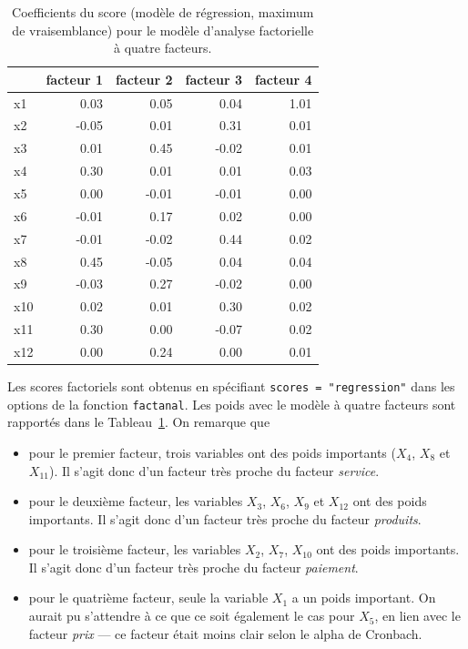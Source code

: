 \documentclass[
  11pt,
  letterpaper,
]{book}
\providecommand{\tightlist}{%
  \setlength{\itemsep}{0pt}\setlength{\parskip}{0pt}}\usepackage{longtable,booktabs,array}
\theoremstyle{definition}
\theoremstyle{remark}
\begin{document}
\hypertarget{tbl-scores}{}
\begin{table}
\caption{\label{tbl-scores}Coefficients du score (modèle de régression, maximum de vraisemblance)
pour le modèle d'analyse factorielle à quatre facteurs. }\tabularnewline

\centering
\begin{tabular}{lrrrr}
\toprule
  & facteur 1 & facteur 2 & facteur 3 & facteur 4\\
\midrule
x1 & 0.03 & 0.05 & 0.04 & 1.01\\
x2 & -0.05 & 0.01 & 0.31 & 0.01\\
x3 & 0.01 & 0.45 & -0.02 & 0.01\\
x4 & 0.30 & 0.01 & 0.01 & 0.03\\
x5 & 0.00 & -0.01 & -0.01 & 0.00\\
\addlinespace
x6 & -0.01 & 0.17 & 0.02 & 0.00\\
x7 & -0.01 & -0.02 & 0.44 & 0.02\\
x8 & 0.45 & -0.05 & 0.04 & 0.04\\
x9 & -0.03 & 0.27 & -0.02 & 0.00\\
x10 & 0.02 & 0.01 & 0.30 & 0.02\\
\addlinespace
x11 & 0.30 & 0.00 & -0.07 & 0.02\\
x12 & 0.00 & 0.24 & 0.00 & 0.01\\
\bottomrule
\end{tabular}
\end{table}

Les scores factoriels sont obtenus en spécifiant
\texttt{scores\ =\ "regression"} dans les options de la fonction
\texttt{factanal}. Les poids avec le modèle à quatre facteurs sont
rapportés dans le Tableau~\ref{tbl-scores}. On remarque que

\begin{itemize}
\tightlist
\item
  pour le premier facteur, trois variables ont des poids importants
  (\(X_4\), \(X_8\) et \(X_{11}\)). Il s'agit donc d'un facteur très
  proche du facteur \emph{service}.
\item
  pour le deuxième facteur, les variables \(X_3\), \(X_6\), \(X_9\) et
  \(X_{12}\) ont des poids importants. Il s'agit donc d'un facteur très
  proche du facteur \emph{produits}.
\item
  pour le troisième facteur, les variables \(X_2\), \(X_7\), \(X_{10}\)
  ont des poids importants. Il s'agit donc d'un facteur très proche du
  facteur \emph{paiement}.
\item
  pour le quatrième facteur, seule la variable \(X_1\) a un poids
  important. On aurait pu s'attendre à ce que ce soit également le cas
  pour \(X_5\), en lien avec le facteur \emph{prix} --- ce facteur était
  moins clair selon le alpha de Cronbach.
\end{itemize}
\end{document}
